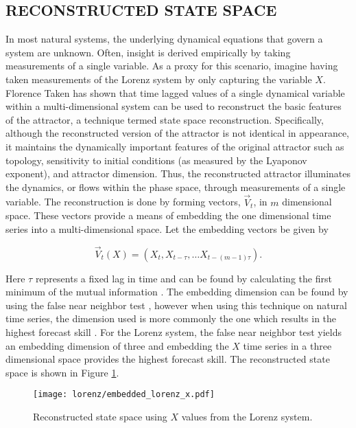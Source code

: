 \subsection{RECONSTRUCTED STATE SPACE}
In most natural systems, the underlying dynamical equations that govern a system are unknown.  Often, insight is derived empirically by taking measurements of a single variable. As a proxy for this scenario, imagine having taken measurements of the Lorenz system by only capturing the variable $X$. Florence Taken has shown \cite{takens_theorem} that time lagged values of a single dynamical variable within a multi-dimensional system can be used to reconstruct the basic features of the attractor, a technique termed state space reconstruction. Specifically, although the reconstructed version of the attractor is not identical in appearance, it maintains the dynamically important features of the original attractor such as topology, sensitivity to initial conditions (as measured by the Lyaponov exponent), and attractor dimension. Thus, the reconstructed attractor illuminates the dynamics, or flows within the phase space, through measurements of a single variable. The reconstruction is done by forming vectors, $\vec V_t$, in $m$ dimensional space. These vectors provide a means of embedding  the one dimensional time series into a multi-dimensional space.  Let the embedding vectors be given by 

$$\vec V_t (X) = (X_t, X_{ t - \tau },\dots X_{ t -(m-1) \tau} ).$$

Here $\tau$ represents a fixed lag in time and can be found by calculating the first minimum of the mutual information \cite{mutual_info}.  The embedding dimension can be found by using the false near neighbor test \cite{chaotic_analysis}, however when using this technique on natural time series, the dimension used is more commonly the one which results in the highest forecast skill \cite{embedding_dimension}. For the Lorenz system, the false near neighbor test yields an embedding dimension of three and embedding the $X$  time series in a three dimensional space provides the highest forecast skill.  The reconstructed state space is shown in Figure \ref{embedded_lorenz_x}. 

\begin{figure}[htbp]  %
   \centering
   \texttt{[image: lorenz/embedded\_lorenz\_x.pdf]} 
   \caption{Reconstructed state space using $X$ values from the Lorenz system. }
   \label{embedded_lorenz_x}
\end{figure}

